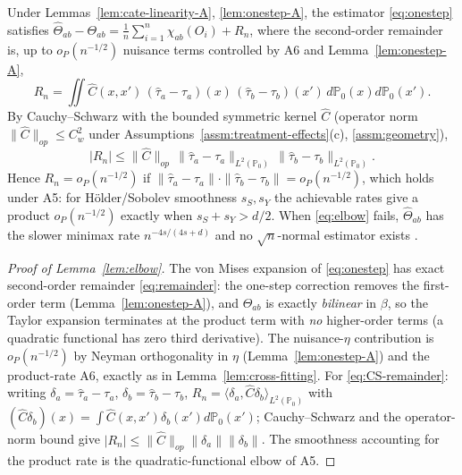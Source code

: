 \begin{lemma}
\label{lem:elbow}
Under Lemmas~\ref{lem:cate-linearity-A}, \ref{lem:onestep-A}, the estimator
\eqref{eq:onestep} satisfies
$\hat\Theta_{ab} - \Theta_{ab} = \frac{1}{n}\sum_{i=1}^n \chi_{ab}(O_i) + R_n$,
where the second-order remainder is, up to $o_P(n^{-1/2})$ nuisance terms controlled by A6 and
Lemma~\ref{lem:onestep-A},
\begin{equation}
R_n = \iint \hat C(x,x')\,(\hat\tau_a-\tau_a)(x)\,(\hat\tau_b-\tau_b)(x')\,d\mathbb{P}_0(x)d\mathbb{P}_0(x').
\label{eq:remainder}
\end{equation}
By Cauchy--Schwarz with the bounded symmetric kernel $\hat C$ (operator norm
$\|\hat C\|_{op}\le C_w^2$ under Assumptions~\ref{assm:treatment-effects}(c), \ref{assm:geometry}),
\begin{equation}
|R_n|
 \le \|\hat C\|_{op}\,\big\|\hat\tau_a-\tau_a\big\|_{L^2(\mathbb{P}_0)}\,
     \big\|\hat\tau_b-\tau_b\big\|_{L^2(\mathbb{P}_0)}.
\label{eq:CS-remainder}
\end{equation}
Hence $R_n=o_P(n^{-1/2})$ if $\|\hat\tau_a-\tau_a\|\cdot\|\hat\tau_b-\tau_b\| = o_P(n^{-1/2})$,
which holds under A5: for H\"older/Sobolev smoothness $s_S,s_Y$ the achievable rates give a
product $o_P(n^{-1/2})$ exactly when $s_S+s_Y>d/2$. When \eqref{eq:elbow} fails, $\hat\Theta_{ab}$
has the slower minimax rate $n^{-4s/(4s+d)}$ and no $\sqrt{n}$-normal estimator exists
\cite{BickelRitov1988,BirgeMassart1995,Robins2008HOIF,Kennedy2024Minimax,McClean2024DCDR}.
\end{lemma}

\begin{proof}[Proof of Lemma~\ref{lem:elbow}]
The von Mises expansion of \eqref{eq:onestep} has exact second-order remainder
\eqref{eq:remainder}: the one-step correction removes the first-order term
(Lemma~\ref{lem:onestep-A}), and $\Theta_{ab}$ is exactly \emph{bilinear} in $\beta$, so the
Taylor expansion terminates at the product term with \emph{no} higher-order terms (a quadratic
functional has zero third derivative). The nuisance-$\eta$ contribution is $o_P(n^{-1/2})$ by
Neyman orthogonality in $\eta$ (Lemma~\ref{lem:onestep-A}) and the product-rate A6, exactly as in
Lemma~\ref{lem:cross-fitting}. For \eqref{eq:CS-remainder}: writing $\delta_a=\hat\tau_a-\tau_a$,
$\delta_b=\hat\tau_b-\tau_b$, $R_n=\langle \delta_a,\hat C\delta_b\rangle_{L^2(\mathbb{P}_0)}$
with $(\hat C\delta_b)(x)=\int\hat C(x,x')\delta_b(x')d\mathbb{P}_0(x')$; Cauchy--Schwarz and the
operator-norm bound give $|R_n|\le\|\hat C\|_{op}\|\delta_a\|\|\delta_b\|$. The smoothness
accounting for the product rate is the quadratic-functional elbow of A5.
\end{proof}

